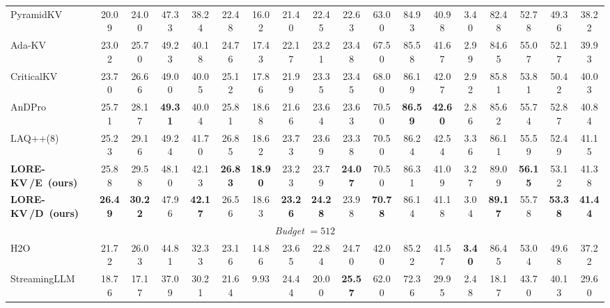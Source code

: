 \documentclass{article} %
\newcommand{\best}[1]{\textcolor{bestblue}{\textbf{#1}}}
\newcommand{\second}[1]{\textcolor{secondorange}{#1}}
\newcommand{\lorekvE}{LORE-KV\,/E}
\newcommand{\lorekvD}{LORE-KV\,/D}
\begin{document}
\begin{table}[t]
{\begin{tabular}{lccccccccccccccccc}
PyramidKV 
& 20.09 & 24.00 & 47.33 
& 38.24 & 22.48 & 16.02 
& 21.40 & 22.45 & 22.63 
& 63.00 & 84.93 & 40.98 
& \second{3.40} & 82.48 
& 52.78 & 49.36 
& 38.22 \\

Ada-KV 
& 23.02 & 25.70 & \second{49.23} 
& 40.18 & 24.76 & 17.43 
& 22.17 & 23.21 & 23.48 
& 67.50 & 85.58 & 41.67 
& 2.99 & 84.65 
& 55.07 & 52.17 
& 39.93 \\

CriticalKV 
& 23.70 & 26.66 & 49.00 
& 40.05 & 25.12 & 17.86 
& 21.99 & 23.35 & 23.45 
& 68.00 & 86.19 & \second{42.07} 
& 2.92 & 85.81 
& 53.81 & 50.42 
& 40.03 \\

AnDPro 
& 25.71 & 28.17 & \best{49.31} 
& 40.04 & 25.81 & \second{18.68} 
& 21.66 & 23.64 & 23.63 
& \second{70.50} & \best{86.59} & \best{42.60} 
& 2.86 & 85.62 
& 55.74 & 52.87 
& 40.84 \\

LAQ++(8)
& 25.23 & 29.16 & 49.24 
& 41.70 & 26.85 & 18.62 
& 23.73 & 23.69 & 23.38 
& 70.50 & 86.24 & 42.54 
& 3.36 & 86.11 
& 55.59 & 52.49 
& 41.15 \\

\textbf{\lorekvE\ (ours)} 
& \second{25.88} & \second{29.58} & 48.10 
& \second{42.13} & \best{26.83} & \best{18.90} 
& \second{23.23} & \second{23.79} & \best{24.07} 
& \second{70.50} & \second{86.31} & 41.09 
& 3.27 & \second{89.09} 
& \best{56.15} & \second{53.12} 
& \second{41.38} \\

\textbf{\lorekvD\ (ours)} 
& \best{26.49} & \best{30.22} & 47.96 
& \best{42.17} & \second{26.56} & 18.63 
& \best{23.26} & \best{24.28} & \second{23.98} 
& \best{70.78} & 86.14 & 41.18 
& 3.04 & \best{89.17} 
& \second{55.78} & \best{53.38} 
& \best{41.44} \\

\midrule
\multicolumn{18}{c}{\textit{Budget} $=512$} \\
\midrule

H2O 
& 21.72 & 26.03 & 44.81 
& 32.33 & 23.16 & 14.86 
& 23.65 & 22.84 & 24.70 
& 42.00 & 85.22 & 41.57 
& \best{3.40} & 86.45 
& 53.04 & 49.68 
& 37.22 \\

StreamingLLM 
& 18.76 & 17.17 & 37.09 
& 30.21 & 21.64 & 9.93 
& 24.44 & 20.00 & \best{25.57} 
& 62.00 & 72.36 & 29.95 
& 2.48 & 18.17 
& 43.70 & 40.13 
& 29.60 \\


\end{tabular}}
\end{table}
\end{document}
